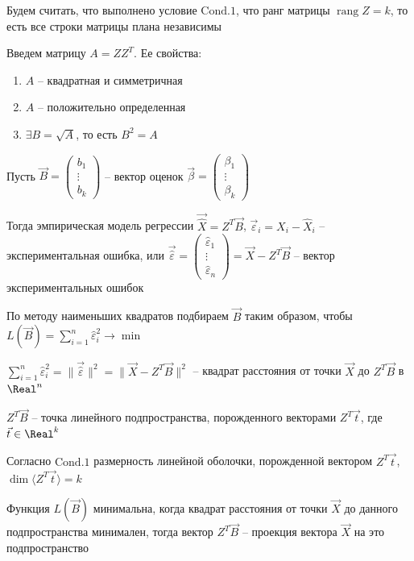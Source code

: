 Будем считать, что выполнено условие $\mathrm{Cond. 1}$, что ранг матрицы $\operatorname{rang} Z = k$, то есть все строки матрицы плана независимы

Введем матрицу $A = Z Z^T$. Ее свойства:

\begin{enumerate}
    \item $A$ -- квадратная и симметричная
    \item $A$ -- положительно определенная
    \item $\exists B = \sqrt{A}$, то есть $B^2 = A$
\end{enumerate}

Пусть $\vec B = \begin{pmatrix}b_1 \\ \vdots \\ b_k\end{pmatrix}$ -- вектор оценок $\vec \beta = \begin{pmatrix}\beta_1 \\ \vdots \\ \beta_k\end{pmatrix}$

Тогда эмпирическая модель регрессии $\vec{\hat X} = Z^T \vec B$, 
$\vec \varepsilon_i = X_i - \hat X_i$ -- экспериментальная ошибка, или $\vec {\hat \varepsilon} = \begin{pmatrix}\hat \varepsilon_1 \\ \vdots \\ \hat \varepsilon_n\end{pmatrix} = \vec X - Z^T \vec B$ -- вектор экспериментальных ошибок

По методу наименьших квадратов подбираем $\vec B$ таким образом, чтобы $L(\vec B) = \sum_{i = 1}^n \hat \varepsilon_i^2 \longrightarrow \min$

$\sum_{i = 1}^n \hat \varepsilon_i^2 = \|\vec{\hat \varepsilon}\|^2 = \| \vec X - Z^T \vec B\|^2$ -- квадрат расстояния от точки $\vec X$ до $Z^T \vec B$ в $\Real^n$

$Z^T \vec B$ -- точка линейного подпространства, порожденного векторами $Z^T \vec t$, где $\vec t \in \Real^k$

\Nota Согласно $\mathrm{Cond. 1}$ размерность линейной оболочки, порожденной вектором $Z^T \vec t$,  $\dim \langle Z^T \vec t \rangle = k$

Функция $L(\vec B)$ минимальна, когда квадрат расстояния от точки $\vec X$ до данного подпространства минимален, тогда вектор $Z^T \vec B$ -- проекция вектора $\vec X$ на это подпространство

